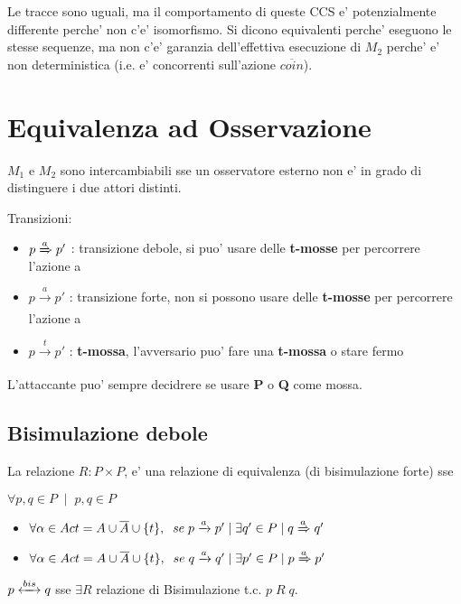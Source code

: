 Le tracce sono uguali, ma il comportamento di queste CCS e' potenzialmente differente perche' non c'e' isomorfismo. Si dicono equivalenti perche' eseguono le stesse sequenze, ma non c'e' garanzia dell'effettiva esecuzione di $M_2$ perche' e' non deterministica (i.e. e' concorrenti sull'azione $\overline {coin}$).

\section{Equivalenza ad Osservazione}

$M_1$ e $M_2$ sono intercambiabili sse un osservatore esterno non e' in grado di distinguere i due attori distinti.

Transizioni:
\begin{itemize}
  \item $p \xRightarrow[]{a} p'$ : transizione debole, si puo' usare delle \textbf{t-mosse} per percorrere l'azione a
  \item $p \xrightarrow[]{a} p'$ : transizione forte, non si possono usare delle \textbf{t-mosse} per percorrere l'azione a
  \item $p \xrightarrow[]{t} p'$ : \textbf{t-mossa}, l'avversario puo' fare una \textbf{t-mossa} o stare fermo
\end{itemize}

  L'attaccante puo' sempre decidrere se usare \textbf{P} o \textbf{Q} come mossa.

\subsection{Bisimulazione debole}

La relazione $R : P \times P$,  e' una relazione di equivalenza (di bisimulazione forte) sse

$\forall p,q \in P \;\; | \;\; p,q \in P$ 

\begin{itemize}
  \item $\forall \alpha \in Act = A \cup \overline A \cup \{t\}, \;\; se \; p \xrightarrow[]{a} p' \; | \; \exists q' \in P \; | \; q \xRightarrow[]{a} q'$
  \item $\forall \alpha \in Act = A \cup \overline A \cup \{t\}, \;\; se \; q \xrightarrow[]{a} q' \; | \; \exists p' \in P \; | \; p \xRightarrow[]{a} p'$
\end{itemize}

$p \xleftrightarrow[]{bis} q$ sse $\exists R$ relazione di Bisimulazione t.c. $p \; R \; q$.

